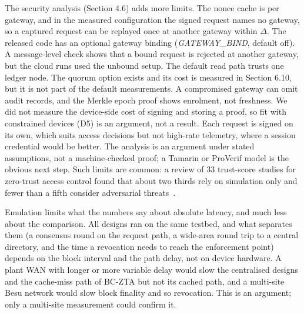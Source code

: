 \documentclass[a4paper,5p,times,twocolumn,number,sort&compress]{elsarticle}
\begin{document}
The security analysis (Section 4.6) adds more limits. The nonce cache is per gateway, and in the measured configuration the signed request names no gateway, so a captured request can be replayed once at another gateway within $\Delta$. The released code has an optional gateway binding (\emph{GATEWAY\_BIND}, default off). A message-level check shows that a bound request is rejected at another gateway, but the cloud runs used the unbound setup. The default read path trusts one ledger node. The quorum option exists and its cost is measured in Section 6.10, but it is not part of the default measurements. A compromised gateway can omit audit records, and the Merkle epoch proof shows enrolment, not freshness. We did not measure the device-side cost of signing and storing a proof, so fit with constrained devices (D5) is an argument, not a result. Each request is signed on its own, which suits access decisions but not high-rate telemetry, where a session credential would be better. The analysis is an argument under stated assumptions, not a machine-checked proof; a Tamarin or ProVerif model is the obvious next step. Such limits are common: a review of 33 trust-score studies for zero-trust access control found that about two thirds rely on simulation only and fewer than a fifth consider adversarial threats~\cite{ruambo26}.

Emulation limits what the numbers say about absolute latency, and much less about the comparison. All designs ran on the same testbed, and what separates them (a consensus round on the request path, a wide-area round trip to a central directory, and the time a revocation needs to reach the enforcement point) depends on the block interval and the path delay, not on device hardware. A plant WAN with longer or more variable delay would slow the centralised designs and the cache-miss path of BC-ZTA but not its cached path, and a multi-site Besu network would slow block finality and so revocation. This is an argument; only a multi-site measurement could confirm it.
\end{document}
